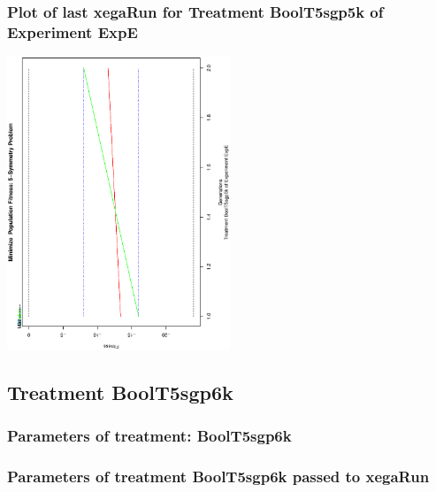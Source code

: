 \documentclass[18pt,c]{beamer}
\makeatletter
\def\beamer@writeslidentry@miniframesoff{%
  \expandafter\beamer@ifempty\expandafter{\beamer@framestartpage}{}%
  {%
   \clearpage\beamer@notesactions%
  }
}
\newcommand*{\miniframesoff}{\let\beamer@writeslidentry=\beamer@writeslidentry@miniframesoff}
\makeatother
\begin{document}
 \begin{frame}
 \frametitle{ Plot of last xegaRun for Treatment BoolT5sgp5k of Experiment ExpE }
 \begin{center}
\includegraphics[width=0.5\textwidth, angle=-90]
{ExpEPlotPopStatsFigure008.eps}
 \end{center}
 \label{report/ExpEPlotPopStatsFigure008.eps}  
 \end{frame}

\miniframesoff
\subsection{Treatment BoolT5sgp6k}

 \begin{frame}
 \fontsize{8pt}{9pt}\selectfont
 \frametitle{  Parameters of treatment: BoolT5sgp6k 
 }

 \label{ExpEtParmTable036.tex}  
 \end{frame}


 \begin{frame}
 \fontsize{8pt}{9pt}\selectfont
 \frametitle{  Parameters of treatment BoolT5sgp6k passed to xegaRun
 }

 \label{ExpEtParmTable037.tex}  
 \end{frame}
\end{document}

